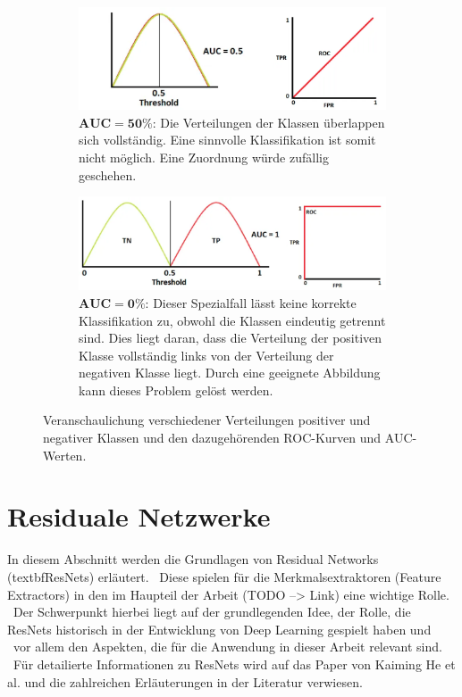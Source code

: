 \begin{figure}[h]
  \begin{subfigure}[b]{\thiswidth}
      \includegraphics[width=\linewidth]{bilder/auc_05.png}
      \caption{$\mathbf{AUC = \num{50}\%}$: Die Verteilungen der Klassen überlappen sich vollständig. Eine sinnvolle Klassifikation ist somit nicht möglich. Eine Zuordnung würde zufällig geschehen.}
      \label{fig:subfig3}
  \end{subfigure}
  \hfill
  \begin{subfigure}[b]{\thiswidth}
      \includegraphics[width=\linewidth]{bilder/auc_1.png}
      \caption{$\mathbf{AUC = \num{0}\%}$: Dieser Spezialfall lässt keine korrekte Klassifikation zu, obwohl die Klassen eindeutig getrennt sind. Dies liegt daran, dass die Verteilung der positiven Klasse vollständig links von der Verteilung der negativen Klasse liegt. Durch eine geeignete Abbildung kann dieses Problem gelöst werden.}
      \label{fig:subfig4}
  \end{subfigure}
  \caption{Veranschaulichung verschiedener Verteilungen positiver und negativer Klassen und den dazugehörenden ROC-Kurven und AUC-Werten.}
  \label{fig:main}
\end{figure}
\newpage
\section{Residuale Netzwerke}\label{sec:ResidualNetworks}
In diesem Abschnitt werden die Grundlagen von Residual Networks (textbf{\glqq ResNets\grqq{}}) erläutert. \
Diese spielen für die Merkmalsextraktoren (\glqq Feature Extractors\grqq{}) in den im Haupteil der Arbeit (TODO --> Link) eine wichtige Rolle. \
Der Schwerpunkt hierbei liegt auf der grundlegenden Idee, der Rolle, die ResNets historisch in der Entwicklung von Deep Learning gespielt haben und \
vor allem den Aspekten, die für die Anwendung in dieser Arbeit relevant sind. \ 
Für detailierte Informationen zu ResNets wird auf das Paper von Kaiming He et al. \cite{resnet} und die zahlreichen Erläuterungen in der Literatur verwiesen. \
